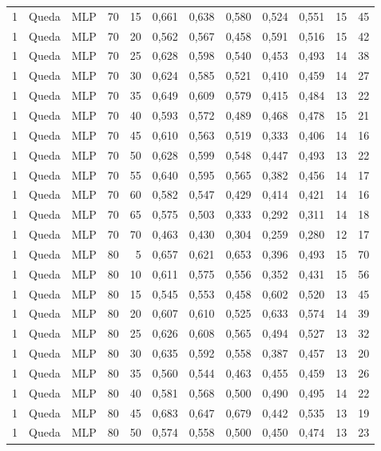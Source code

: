 \begin{longtable}{@{}rllrrrrrrrrr@{}}
1 & Queda & MLP & 70 & 15 & 0,661 & 0,638 & 0,580 & 0,524 & 0,551 & 15 & 45 \\
1 & Queda & MLP & 70 & 20 & 0,562 & 0,567 & 0,458 & 0,591 & 0,516 & 15 & 42 \\
1 & Queda & MLP & 70 & 25 & 0,628 & 0,598 & 0,540 & 0,453 & 0,493 & 14 & 38 \\
1 & Queda & MLP & 70 & 30 & 0,624 & 0,585 & 0,521 & 0,410 & 0,459 & 14 & 27 \\
1 & Queda & MLP & 70 & 35 & 0,649 & 0,609 & 0,579 & 0,415 & 0,484 & 13 & 22 \\
1 & Queda & MLP & 70 & 40 & 0,593 & 0,572 & 0,489 & 0,468 & 0,478 & 15 & 21 \\
1 & Queda & MLP & 70 & 45 & 0,610 & 0,563 & 0,519 & 0,333 & 0,406 & 14 & 16 \\
1 & Queda & MLP & 70 & 50 & 0,628 & 0,599 & 0,548 & 0,447 & 0,493 & 13 & 22 \\
1 & Queda & MLP & 70 & 55 & 0,640 & 0,595 & 0,565 & 0,382 & 0,456 & 14 & 17 \\
1 & Queda & MLP & 70 & 60 & 0,582 & 0,547 & 0,429 & 0,414 & 0,421 & 14 & 16 \\
1 & Queda & MLP & 70 & 65 & 0,575 & 0,503 & 0,333 & 0,292 & 0,311 & 14 & 18 \\
1 & Queda & MLP & 70 & 70 & 0,463 & 0,430 & 0,304 & 0,259 & 0,280 & 12 & 17 \\
1 & Queda & MLP & 80 & 5 & 0,657 & 0,621 & 0,653 & 0,396 & 0,493 & 15 & 70 \\
1 & Queda & MLP & 80 & 10 & 0,611 & 0,575 & 0,556 & 0,352 & 0,431 & 15 & 56 \\
1 & Queda & MLP & 80 & 15 & 0,545 & 0,553 & 0,458 & 0,602 & 0,520 & 13 & 45 \\
1 & Queda & MLP & 80 & 20 & 0,607 & 0,610 & 0,525 & 0,633 & 0,574 & 14 & 39 \\
1 & Queda & MLP & 80 & 25 & 0,626 & 0,608 & 0,565 & 0,494 & 0,527 & 13 & 32 \\
1 & Queda & MLP & 80 & 30 & 0,635 & 0,592 & 0,558 & 0,387 & 0,457 & 13 & 20 \\
1 & Queda & MLP & 80 & 35 & 0,560 & 0,544 & 0,463 & 0,455 & 0,459 & 13 & 26 \\
1 & Queda & MLP & 80 & 40 & 0,581 & 0,568 & 0,500 & 0,490 & 0,495 & 14 & 22 \\
1 & Queda & MLP & 80 & 45 & 0,683 & 0,647 & 0,679 & 0,442 & 0,535 & 13 & 19 \\
1 & Queda & MLP & 80 & 50 & 0,574 & 0,558 & 0,500 & 0,450 & 0,474 & 13 & 23 \\

\end{longtable}
